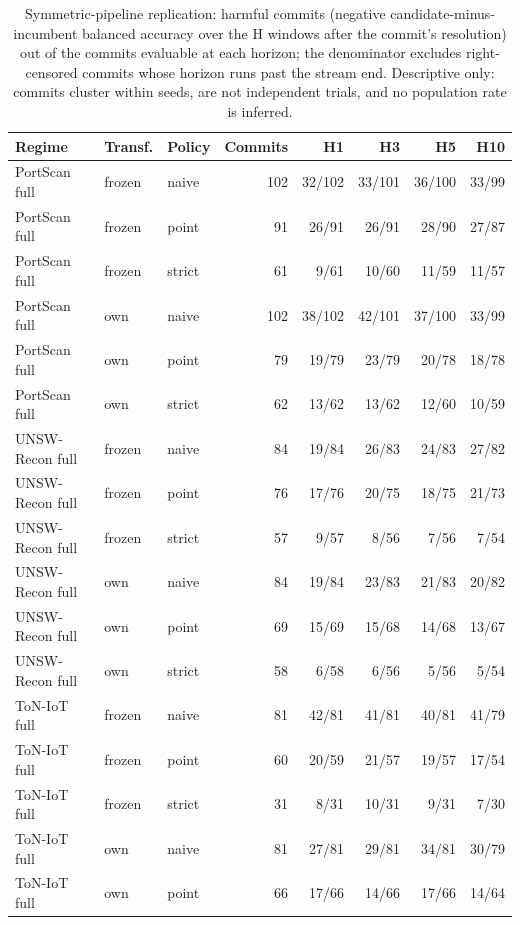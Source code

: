 \begin{table}
\centering
\caption{Symmetric-pipeline replication: harmful commits (negative candidate-minus-incumbent
balanced accuracy over the H windows after the commit's resolution) out of the commits
evaluable at each horizon; the denominator excludes right-censored commits whose horizon runs
past the stream end. Descriptive only: commits cluster within seeds, are not independent
trials, and no population rate is inferred.}
\label{tab:symmetric_supp_harm}
\scriptsize
\begin{tabular}{l l l r r r r r}
\toprule
Regime & Transf. & Policy & Commits & H1 & H3 & H5 & H10 \\
\midrule
PortScan full & frozen & naive & 102 & 32/102 & 33/101 & 36/100 & 33/99 \\
PortScan full & frozen & point & 91 & 26/91 & 26/91 & 28/90 & 27/87 \\
PortScan full & frozen & strict & 61 & 9/61 & 10/60 & 11/59 & 11/57 \\
PortScan full & own & naive & 102 & 38/102 & 42/101 & 37/100 & 33/99 \\
PortScan full & own & point & 79 & 19/79 & 23/79 & 20/78 & 18/78 \\
PortScan full & own & strict & 62 & 13/62 & 13/62 & 12/60 & 10/59 \\
\addlinespace
UNSW-Recon full & frozen & naive & 84 & 19/84 & 26/83 & 24/83 & 27/82 \\
UNSW-Recon full & frozen & point & 76 & 17/76 & 20/75 & 18/75 & 21/73 \\
UNSW-Recon full & frozen & strict & 57 & 9/57 & 8/56 & 7/56 & 7/54 \\
UNSW-Recon full & own & naive & 84 & 19/84 & 23/83 & 21/83 & 20/82 \\
UNSW-Recon full & own & point & 69 & 15/69 & 15/68 & 14/68 & 13/67 \\
UNSW-Recon full & own & strict & 58 & 6/58 & 6/56 & 5/56 & 5/54 \\
\addlinespace
ToN-IoT full & frozen & naive & 81 & 42/81 & 41/81 & 40/81 & 41/79 \\
ToN-IoT full & frozen & point & 60 & 20/59 & 21/57 & 19/57 & 17/54 \\
ToN-IoT full & frozen & strict & 31 & 8/31 & 10/31 & 9/31 & 7/30 \\
ToN-IoT full & own & naive & 81 & 27/81 & 29/81 & 34/81 & 30/79 \\
ToN-IoT full & own & point & 66 & 17/66 & 14/66 & 17/66 & 14/64 \\

\end{tabular}
\end{table}
